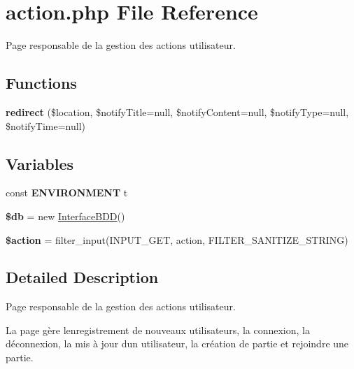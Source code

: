 \hypertarget{action_8php}{}\section{action.\+php File Reference}
\label{action_8php}


Page responsable de la gestion des actions utilisateur.  


\subsection*{Functions}
\begin{DoxyCompactItemize}
\item 
\mbox{\label{action_8php_a6b146ac6de362f2eed0d49e11c682848}} 
{\bfseries redirect} (\$location, \$notify\+Title=null, \$notify\+Content=null, \$notify\+Type=null, \$notify\+Time=null)
\end{DoxyCompactItemize}
\subsection*{Variables}
\begin{DoxyCompactItemize}
\item 
\mbox{\label{action_8php_a8757a57d09df5349f8b93b2083e29a1e}} 
const {\bfseries E\+N\+V\+I\+R\+O\+N\+M\+E\+NT} \textquotesingle{}t\textquotesingle{}
\item 
\mbox{\label{action_8php_a1fa3127fc82f96b1436d871ef02be319}} 
{\bfseries \$db} = new \mbox{\hyperlink{class_interface_b_d_d}{Interface\+B\+DD}}()
\item 
\mbox{\label{action_8php_aa698a3e72116e8e778be0e95d908ee30}} 
{\bfseries \$action} = filter\+\_\+input(I\+N\+P\+U\+T\+\_\+\+G\+ET, \textquotesingle{}action\textquotesingle{}, F\+I\+L\+T\+E\+R\+\_\+\+S\+A\+N\+I\+T\+I\+Z\+E\+\_\+\+S\+T\+R\+I\+NG)
\end{DoxyCompactItemize}


\subsection{Detailed Description}
Page responsable de la gestion des actions utilisateur. 

La page gère l\textquotesingle{}enregistrement de nouveaux utilisateurs, la connexion, la déconnexion, la mis à jour d\textquotesingle{}un utilisateur, la création de partie et rejoindre une partie. 
